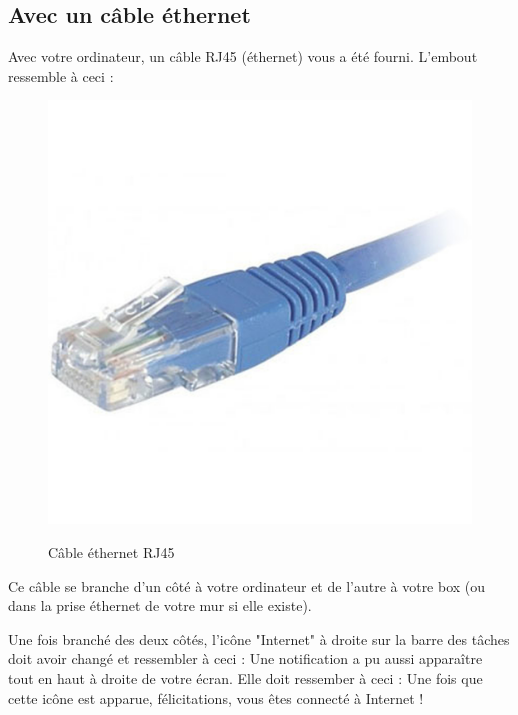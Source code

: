 \documentclass[12pt]{book}
\begin{document}
	\subsection{Avec un câble éthernet}
		Avec votre ordinateur, un câble RJ45 (éthernet) vous a été fourni.
		L'embout ressemble à ceci :
		\begin{figure}[h]
			\centering
			\includegraphics[scale=0.05]{include/rj45.jpg}
			\label{fig:rj45}
			\caption{Câble éthernet RJ45}
		\end{figure}\newline
		Ce câble se branche d'un côté à votre ordinateur et de l'autre à votre box (ou dans la prise éthernet de votre mur si elle existe).\par
		Une fois branché des deux côtés, l'icône "Internet" à droite sur la barre des tâches doit avoir changé et ressembler à ceci :
		\newline
		Une notification a pu aussi apparaître tout en haut à droite de votre écran.
		Elle doit ressember à ceci :
		Une fois que cette icône est apparue, félicitations, vous êtes connecté à Internet !
\end{document}
